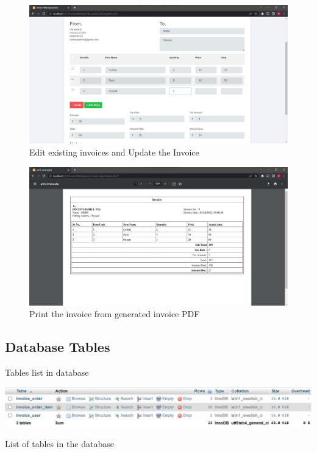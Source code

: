 \pagebreak

\begin{figure}[h]\centering
	\includegraphics[width=6in]{./images/editInvoice.jpg}
	\caption{Edit existing invoices and Update the Invoice}\label{editInvoice}
\end{figure}

\begin{figure}[h]\centering
	\includegraphics[width=6in]{./images/printInvoice.jpg}
	\caption{Print the invoice from generated invoice PDF}\label{printInvoice}
\end{figure}

\pagebreak

\subsection{Database Tables}

Tables list in database
\begin{table}[h]\centering
	\includegraphics[width=6in]{./images/invoicetables.jpg}
	\caption{List of tables in the database}\label{invoicetables}
\end{table}

